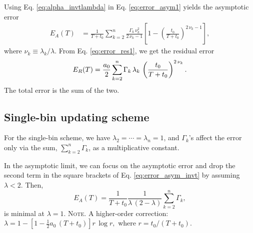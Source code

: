 \documentclass[reprint, superscriptaddress, floatfix]{revtex4-1}
\newcommand{\note}[1]{{\color{DarkGreen}\footnotesize \textsc{Note.} #1}}
\newcommand{\Err}{E}
\begin{document}
Using Eq. \eqref{eq:alpha_invtlambda}
in Eq. \eqref{eq:error_asym1} yields
the asymptotic error
%
\begin{align}
  \Err_A(T)
  &=
  \frac{    1    }
       { T + t_0 }
  \sum_{k = 2}^n
    \frac{ \Gamma_k \, \nu_k^2 }
         {    2 \, \nu_k - 1   }
  \left[
    1 - \left(
          \frac {     t_0 }
                { T + t_0 }
        \right)^{ 2 \, \nu_k - 1 }
  \right]
  ,
\label{eq:error_asym_invt}
\end{align}
%
where $\nu_k \equiv \lambda_k / \lambda$.
%
From Eq. \eqref{eq:error_res1},
we get the residual error
%
\begin{equation}
  \Err_R(T)
  =
  \frac { a_0 } { 2 }
  \sum_{k = 2}^n
  \Gamma_k \, \lambda_k \,
  \left(
      \frac{   t_0   }
           { T + t_0 }
  \right)^{ 2 \, \nu_k }
  .
\notag
\end{equation}
%
The total error is the sum of the two.
%
%




\subsection{\label{sec:invt_singlebin}
  Single-bin updating scheme
}



For the single-bin scheme, we have
$\lambda_2 = \cdots = \lambda_n = 1$,
and
$\Gamma_k$'s affect the error
only via the sum, $\sum_{k = 2}^n \Gamma_k$,
as a multiplicative constant.

In the asymptotic limit,
we can focus on the asymptotic error
and drop the second term in the square brackets
of Eq. \eqref{eq:error_asym_invt}
by assuming $\lambda < 2$.
%
Then,
$$
  \Err_A(T)
  =
  \frac { 1 } { T + t_0 }
  \frac {             1            }
        { \lambda \, (2 - \lambda) }
  \sum_{ k = 2 }^n \Gamma_k
  ,
$$
is minimal at $\lambda = 1$.
%
\note{A higher-order correction:
  $
  \lambda = 1 -
  \left[
    1 - \frac 1 2 a_0 \, (T+t_0)
  \right] r \, \log r
  ,
  $
  where $r = t_0 / (T + t_0)$.
}
\end{document}
